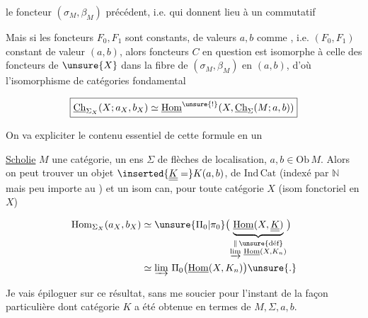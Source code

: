 
le foncteur $(\sigma_M,\beta_M)$ précédent, i.e. qui donnent lieu à un   commutatif 


Mais si les foncteurs $F_0,F_1$ sont constants, de valeurs $a,b$ comme , i.e. $(F_0,F_1)$ constant de valeur $(a,b)$, alors   foncteurs $C$ en question est  isomorphe à celle des foncteurs de $\unsure{X}$ dans la fibre de $(\sigma_M,\beta_M)$ en $(a,b)$, d'où l'isomorphisme de catégories fondamental

\[
\boxed{\underline{\mathrm{Ch}}_{\Sigma_X}(X;a_X,b_X)\simeq
 \underline{\mathrm{Hom}}^{\unsure{!}}(X,\underline{\mathrm{Ch}}_{\Sigma}(M;a,b))}
\]

On va expliciter le contenu essentiel de cette formule en un

\uline{Scholie}  $M$ une catégorie,  un ens $\Sigma$ de flèches de localisation, $a,b\in\mathrm{Ob}\,M$. Alors on peut trouver un  objet $\inserted{\underline{\underline K}=}K(a,b)$,  de $\mathrm{Ind}\,\mathrm{Cat}$ (indexé par $\mathbb N$ mais peu importe au ) et un isom can, pour toute catégorie $X$ (isom fonctoriel en $X$)

\[
\begin{aligned}
\mathrm{Hom}_{\Sigma_X}(a_X,b_X)&\simeq
 \unsure{\Pi_0|\pi_0}\bigl(\underbrace{\underline{\mathrm{Hom}}(X,\underline{\underline K})}_{\substack{\Vert\,\unsure{\text{déf}}\\ \varinjlim\,\underline{\mathrm{Hom}}(X,K_n)}}\bigr)\\
 &\simeq\varinjlim\,\Pi_0\bigl(\underline{\mathrm{Hom}}(X,K_n)\bigr)\unsure{.}
\end{aligned}
\]


Je vais épiloguer sur ce résultat, sans me soucier pour l'instant de la façon particulière dont    catégorie $K$ a été obtenue en termes de $M,\Sigma,a,b$.

